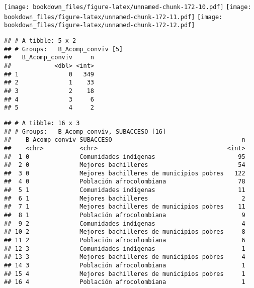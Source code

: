 \documentclass[]{article}
\theoremstyle{definition}
\theoremstyle{definition}
\theoremstyle{definition}
\theoremstyle{remark}
\begin{document}
\texttt{[image: bookdown\_files/figure-latex/unnamed-chunk-172-10.pdf]}
\texttt{[image: bookdown\_files/figure-latex/unnamed-chunk-172-11.pdf]}
\texttt{[image: bookdown\_files/figure-latex/unnamed-chunk-172-12.pdf]}

\begin{verbatim}
## # A tibble: 5 x 2
## # Groups:   B_Acomp_conviv [5]
##   B_Acomp_conviv     n
##            <dbl> <int>
## 1              0   349
## 2              1    33
## 3              2    18
## 4              3     6
## 5              4     2
\end{verbatim}

\begin{verbatim}
## # A tibble: 16 x 3
## # Groups:   B_Acomp_conviv, SUBACCESO [16]
##    B_Acomp_conviv SUBACCESO                                    n
##    <chr>          <chr>                                    <int>
##  1 0              Comunidades indígenas                       95
##  2 0              Mejores bachilleres                         54
##  3 0              Mejores bachilleres de municipios pobres   122
##  4 0              Población afrocolombiana                    78
##  5 1              Comunidades indígenas                       11
##  6 1              Mejores bachilleres                          2
##  7 1              Mejores bachilleres de municipios pobres    11
##  8 1              Población afrocolombiana                     9
##  9 2              Comunidades indígenas                        4
## 10 2              Mejores bachilleres de municipios pobres     8
## 11 2              Población afrocolombiana                     6
## 12 3              Comunidades indígenas                        1
## 13 3              Mejores bachilleres de municipios pobres     4
## 14 3              Población afrocolombiana                     1
## 15 4              Mejores bachilleres de municipios pobres     1
## 16 4              Población afrocolombiana                     1
\end{verbatim}
\end{document}
